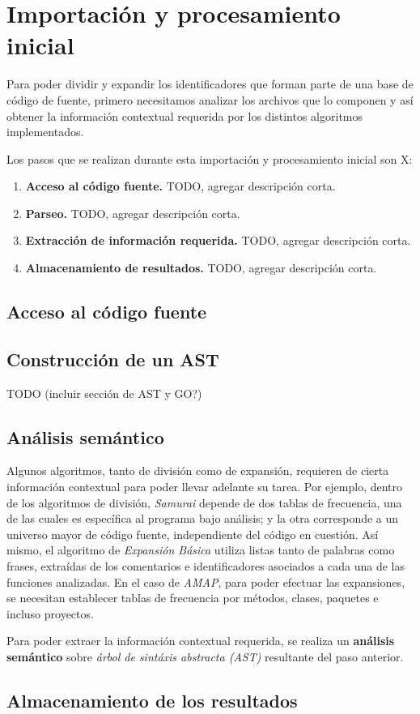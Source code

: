 \section{Importación y procesamiento inicial}

Para poder dividir y expandir los identificadores que forman parte de una base de código de fuente, primero necesitamos analizar los archivos que lo componen y así obtener la información contextual requerida por los distintos algoritmos implementados.

Los pasos que se realizan durante esta importación y procesamiento inicial son X:
\begin{enumerate}
  \item \textbf{Acceso al código fuente.} TODO, agregar descripción corta.
  \item \textbf{Parseo.} TODO, agregar descripción corta.
  \item \textbf{Extracción de información requerida.} TODO, agregar descripción corta.
  \item \textbf{Almacenamiento de resultados.} TODO, agregar descripción corta.
\end{enumerate}

\subsection{Acceso al código fuente}

\subsection{Construcción de un AST}
TODO (incluir sección de AST y GO?)

\subsection{Análisis semántico}
Algunos algoritmos, tanto de división como de expansión, requieren de cierta información contextual para poder llevar adelante su tarea.
Por ejemplo, dentro de los algoritmos de división, \textit{Samurai} depende de dos tablas de frecuencia, una de las cuales es específica al programa bajo análisis; y la otra corresponde a un universo mayor de código fuente, independiente del código en cuestión.
Así mismo, el algoritmo de \textit{Expansión Básica} utiliza listas tanto de palabras como frases, extraídas de los comentarios e identificadores asociados a cada una de las funciones analizadas.
En el caso de \textit{AMAP}, para poder efectuar las expansiones, se necesitan establecer tablas de frecuencia por métodos, clases, paquetes e incluso proyectos.

Para poder extraer la información contextual requerida, se realiza un \textbf{análisis semántico} sobre \textit{árbol de sintáxis abstracta (AST)} resultante del paso anterior.

\subsection{Almacenamiento de los resultados}
